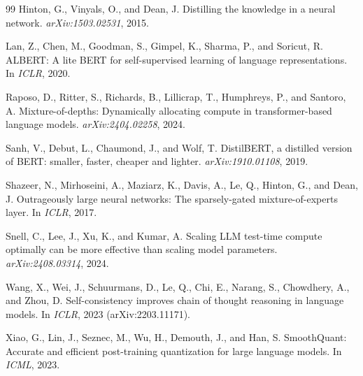 \begin{thebibliography}{99}
Hinton, G., Vinyals, O., and Dean, J.
Distilling the knowledge in a neural network.
\emph{arXiv:1503.02531}, 2015.

Lan, Z., Chen, M., Goodman, S., Gimpel, K., Sharma, P., and Soricut, R.
ALBERT: A lite BERT for self-supervised learning of language representations.
In \emph{ICLR}, 2020.

Raposo, D., Ritter, S., Richards, B., Lillicrap, T., Humphreys, P., and
Santoro, A.
Mixture-of-depths: Dynamically allocating compute in transformer-based
language models. \emph{arXiv:2404.02258}, 2024.

Sanh, V., Debut, L., Chaumond, J., and Wolf, T.
DistilBERT, a distilled version of BERT: smaller, faster, cheaper and lighter.
\emph{arXiv:1910.01108}, 2019.

Shazeer, N., Mirhoseini, A., Maziarz, K., Davis, A., Le, Q., Hinton, G.,
and Dean, J.
Outrageously large neural networks: The sparsely-gated mixture-of-experts
layer. In \emph{ICLR}, 2017.

Snell, C., Lee, J., Xu, K., and Kumar, A.
Scaling LLM test-time compute optimally can be more effective than scaling
model parameters. \emph{arXiv:2408.03314}, 2024.

Wang, X., Wei, J., Schuurmans, D., Le, Q., Chi, E., Narang, S., Chowdhery, A.,
and Zhou, D.
Self-consistency improves chain of thought reasoning in language models.
In \emph{ICLR}, 2023 (arXiv:2203.11171).

Xiao, G., Lin, J., Seznec, M., Wu, H., Demouth, J., and Han, S.
SmoothQuant: Accurate and efficient post-training quantization for large
language models. In \emph{ICML}, 2023.

\end{thebibliography}
